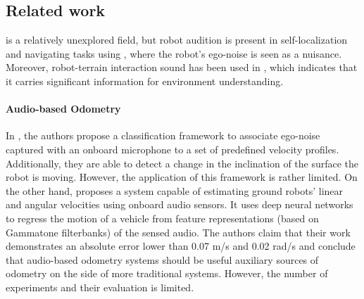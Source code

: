 \subsection{Related work} \label{sec:related-work}

 is a relatively unexplored field, but robot
audition is present in self-localization and navigating tasks using
, where the robot's ego-noise is seen
as a nuisance. Moreover, robot-terrain interaction sound has been used in
, which indicates that it carries
significant information for environment understanding.


\paragraph{Audio-based Odometry} \label{para:audio-based-odometry} In
\cite{HowDoISoundLike}, the authors propose a classification framework to
associate ego-noise captured with an onboard microphone to a set of predefined
velocity profiles. Additionally, they are able to detect a change in the
inclination of the surface the robot is moving. However, the application of
this framework is rather limited. On the other hand, \cite{marchegiani2018a}
proposes a system capable of estimating ground robots' linear and angular
velocities using onboard audio sensors. It uses deep neural networks to
regress the motion of a vehicle from feature representations (based on
Gammatone filterbanks) of the sensed audio. The authors claim that their work
demonstrates an absolute error lower than 0.07 m/s and 0.02 rad/s and
conclude that audio-based odometry systems should be useful auxiliary sources
of odometry on the side of more traditional systems. However, the number of
experiments and their evaluation is limited.

